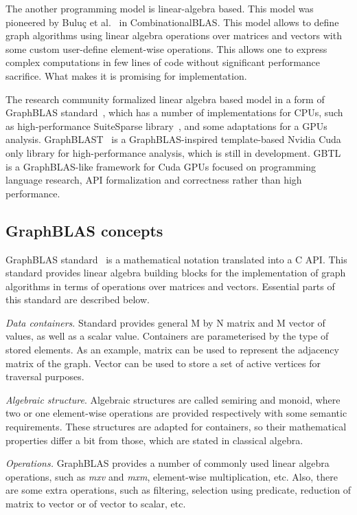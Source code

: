 The another programming model is linear-algebra based. This model was pioneered by Buluç et al.~\cite{article:combblas} in CombinationalBLAS. This model allows to define graph algorithms using linear algebra operations over matrices and vectors with some custom user-define element-wise operations. This allows one to express complex computations in few lines of code without significant performance sacrifice. What makes it is promising for implementation. 

The research community formalized linear algebra based model in a form of GraphBLAS standard~\cite{7761646}, which has a number of implementations for CPUs, such as high-performance SuiteSparse library~\cite{10.1145/3322125}, and some adaptations for a GPUs analysis. GraphBLAST~\cite{yang2019graphblast} is a GraphBLAS-inspired template-based Nvidia Cuda only library for high-performance analysis, which is still in development.
GBTL~\cite{7529957} is a GraphBLAS-like framework for Cuda GPUs focused on programming language research, API formalization and correctness rather than high performance. 

\subsection{GraphBLAS concepts}

GraphBLAS standard~\cite{7761646} is a mathematical notation translated into a C API. This standard provides linear algebra building blocks for the implementation of graph algorithms in terms of operations over matrices and vectors. Essential parts of this standard are described below.

\textit{Data containers}. Standard provides general M by N matrix and M vector of values, as well as a scalar value. Containers are parameterised by the type of stored elements. As an example, matrix can be used to represent the adjacency matrix of the graph. Vector can be used to store a set of active vertices for traversal purposes. 

\textit{Algebraic structure}. Algebraic structures are called semiring and monoid, where two or one element-wise operations are provided respectively with some semantic requirements. These structures are adapted for containers, so their mathematical properties differ a bit from those, which are stated in classical algebra.

\textit{Operations.} GraphBLAS provides a number of commonly used linear algebra operations, such as \textit{mxv} and \textit{mxm}, element-wise multiplication, etc. Also, there are some extra operations, such as filtering, selection using predicate, reduction of matrix to vector or of vector to scalar, etc.

